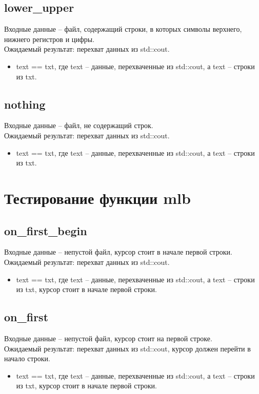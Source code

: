\documentclass{article}
\begin{document}
\subsection{lower\_upper}
Входные данные -- файл, содержащий строки, в которых символы верхнего, нижнего регистров и цифры.\\
Ожидаемый результат: перехват данных из std::cout.
\begin{itemize}
    \item text == txt, где text -- данные, перехваченные из std::cout, а text -- строки из txt.
\end{itemize}
\subsection{nothing}
Входные данные -- файл, не содержащий строк.\\
Ожидаемый результат: перехват данных из std::cout.
\begin{itemize}
    \item text == txt, где text -- данные, перехваченные из std::cout, а text -- строки из txt.
\end{itemize}
\newpage


\section{Тестирование функции mlb}
\subsection{on\_first\_begin}
Входные данные -- непустой файл, курсор стоит в начале первой строки.\\
Ожидаемый результат: перехват данных из std::cout.
\begin{itemize}
    \item text == txt, где text -- данные, перехваченные из std::cout, а text -- строки из txt, курсор стоит в начале первой строки.
\end{itemize}
\subsection{on\_first}
Входные данные -- непустой файл, курсор стоит на первой строке.\\
Ожидаемый результат: перехват данных из std::cout, курсор должен перейти в начало строки.
\begin{itemize}
    \item text == txt, где text -- данные, перехваченные из std::cout, а text -- строки из txt, курсор стоит в начале первой строки.
\end{itemize}
\end{document}
